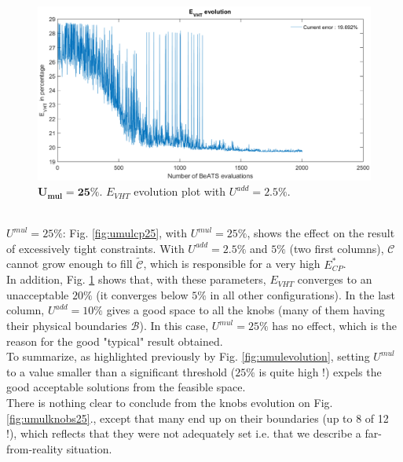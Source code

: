\begin{figure}[!h]
	\label{fig:badvht}
	\caption{$\mathbf{U_{mul}=25\%}$. $E_{VHT}$ evolution plot with $U^{add}=2.5\% $.}
	\includegraphics[width=7in]{figures/results_figures/Umul/bad_vht.png}
\end{figure}		
\\
\emph{$U^{mul}=25\% $}: Fig. \ref{fig:umulcp25}, with $U^{mul}=25\% $, shows the effect on the result of excessively tight constraints.  With $U^{add}=2.5\% $ and $5\% $ (two first columns), $\mathscr{C}$ cannot grow enough to fill $\widetilde{\mathscr{C}}$, which is responsible for a very high $E_{CP}^{*}$.\\
In addition, Fig. \ref{fig:badvht} shows that, with these parameters, $E_{VHT}$ converges to an unacceptable $20\% $ (it converges below $5 \% $ in all other configurations).
In the last column, $U^{add}=10\% $ gives a good space to all the knobs (many of them having their physical boundaries $\mathscr{B}$). In this case, $U^{mul}=25\% $ has no effect, which is the reason for the good "typical" result obtained.\\
To summarize, as highlighted previously by Fig. \ref{fig:umulevolution}, setting $U^{mul}$ to a value smaller than a significant threshold ($25\% $ is quite high !) expels the good acceptable solutions from the feasible space.\\

There is nothing clear to conclude from the knobs evolution on Fig. \ref{fig:umulknobs25}., except that many end up on their boundaries (up to 8 of 12 !), which reflects that they were not adequately set i.e. that we describe a far-from-reality situation.
\\


